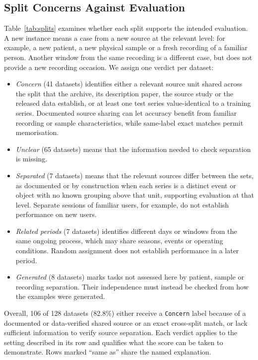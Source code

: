   \subsection{Split Concerns Against Evaluation}
  Table~\ref{tab:splits} examines whether each split supports the intended evaluation. A new instance means a case from a new source at the relevant level: for example, a new patient, a new physical sample or a fresh recording of a familiar person. Another window from the same recording is a different case, but does not provide a new recording occasion. We assign one verdict per dataset:       
  \begin{itemize}[leftmargin=*,itemsep=2pt,topsep=3pt]                                                   
  \item \emph{Concern} (41 datasets) identifies either a relevant source unit shared across the split that the archive, its description paper, the source study or the released data establish, or at least one test series value-identical to a training series. Documented source sharing can let accuracy benefit from familiar recording or sample characteristics, while same-label exact matches permit memorisation.
  \item \emph{Unclear} (65 datasets) means that the information needed to check separation is missing. 

  \item \emph{Separated} (7 datasets) means that the relevant sources differ between the sets, as documented or by construction when each series is a distinct event or object with no known grouping above that unit, supporting evaluation at that level. Separate sessions of familiar users, for example, do not establish performance on new users.

  \item \emph{Related periods} (7 datasets) identifies different days or windows from the same ongoing process, which may share seasons, events or operating conditions. Random assignment does not establish performance in a later period.

  \item \emph{Generated} (8 datasets) marks tasks not assessed here by patient, sample or recording separation. Their independence must instead be checked from how the examples were generated.

  \end{itemize}

  Overall, 106 of 128 datasets (82.8\%) either receive a \texttt{Concern} label because of a documented or data-verified shared source or an exact cross-split match, or lack sufficient information to verify source separation. Each verdict applies to the setting described in its row and qualifies what the score can be taken to demonstrate. Rows marked ``same as'' share the named explanation.

  {\footnotesize\setlength{\tabcolsep}{3pt}}
